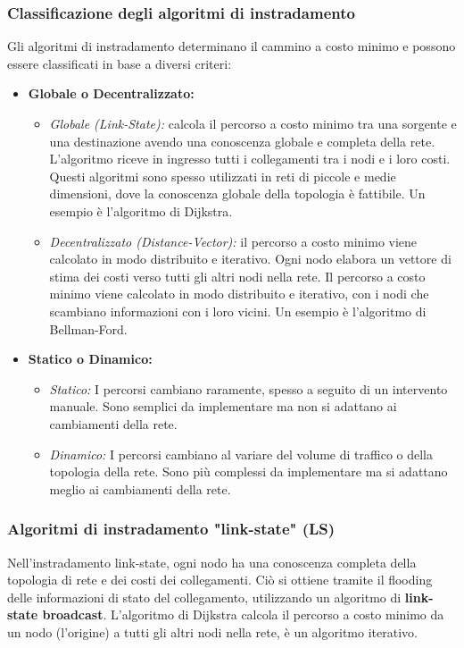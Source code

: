 \subsubsection*{Classificazione degli algoritmi di instradamento}
Gli algoritmi di instradamento determinano il cammino a costo minimo e possono essere classificati in base a diversi criteri:
\begin{itemize}
    \item \textbf{Globale o Decentralizzato:}
        \begin{itemize}
            \item \textit{Globale (Link-State):} calcola il percorso a costo minimo tra una sorgente e una destinazione avendo una conoscenza globale e completa della rete. L'algoritmo riceve in ingresso tutti i collegamenti tra i nodi e i loro costi. Questi algoritmi sono spesso utilizzati in reti di piccole e medie dimensioni, dove la conoscenza globale della topologia è fattibile. Un esempio è l'algoritmo di Dijkstra.
            \item \textit{Decentralizzato (Distance-Vector):} il percorso a costo minimo viene calcolato in modo distribuito e iterativo. Ogni nodo elabora un vettore di stima dei costi verso tutti gli altri nodi nella rete. Il percorso a costo minimo viene calcolato in modo distribuito e iterativo, con i nodi che scambiano informazioni con i loro vicini. Un esempio è l'algoritmo di Bellman-Ford.
        \end{itemize}
    \item \textbf{Statico o Dinamico:}
        \begin{itemize}
            \item \textit{Statico:} I percorsi cambiano raramente, spesso a seguito di un intervento manuale. Sono semplici da implementare ma non si adattano ai cambiamenti della rete.
            \item \textit{Dinamico:} I percorsi cambiano al variare del volume di traffico o della topologia della rete. Sono più complessi da implementare ma si adattano meglio ai cambiamenti della rete.
        \end{itemize}
\end{itemize}

\subsubsection{Algoritmi di instradamento "link-state" (LS)}
Nell'instradamento link-state, ogni nodo ha una conoscenza completa della topologia di rete e dei costi dei collegamenti. 
Ciò si ottiene tramite il flooding delle informazioni di stato del collegamento, utilizzando un algoritmo di \textbf{link-state broadcast}. 
L'algoritmo di Dijkstra calcola il percorso a costo minimo da un nodo (l'origine) a tutti gli altri nodi nella rete, è un algoritmo iterativo.

